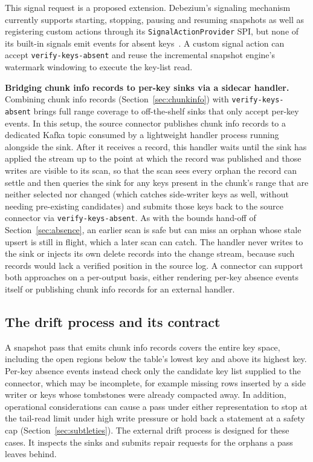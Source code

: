 \documentclass[sigconf,nonacm,10pt]{acmart}
\begin{document}
This signal request is a proposed extension. Debezium's signaling mechanism
currently supports starting, stopping, pausing and resuming snapshots as well
as registering custom actions through its \texttt{SignalActionProvider} SPI, but none of its built-in signals emit events for absent keys~\cite{debezium_signalling}. A
custom signal action can accept \texttt{verify-keys-absent} and reuse
the incremental snapshot engine's watermark windowing to execute the key-list
read.

\textbf{Bridging chunk info records to per-key sinks via a sidecar handler.} Combining
chunk info records (Section~\ref{sec:chunkinfo}) with
\texttt{verify-keys-absent} brings full range coverage
to off-the-shelf sinks that only accept per-key events. In this setup, the source connector publishes chunk info records to a dedicated Kafka topic consumed by
a lightweight handler process running alongside the sink. After it receives a record, this handler waits until the sink has applied the stream up to the point at
which the record was published and those writes are visible to its scan, so
that the scan sees every orphan the record can settle and then queries the sink for any keys present in the
chunk's range that are neither selected nor changed (which catches side-writer keys as well, without needing
pre-existing candidates) and submits those keys back to the source connector
via \texttt{verify-keys-absent}. As with the bounds hand-off of
Section~\ref{sec:absence}, an earlier scan is safe but can miss an orphan whose
stale upsert is still in flight, which a later scan can catch. The handler never writes to the
sink or injects its own delete records into the change stream, because
such records would lack a verified position in the source log. A connector can support both approaches on a
per-output basis, either rendering per-key absence events itself or publishing
chunk info records for an external handler.

\subsection{The drift process and its contract}\label{sec:drift}

A snapshot pass that emits chunk info records covers the entire key space,
including the open regions below the table's lowest key and above its highest
key. Per-key absence events instead check only the candidate key list supplied
to the connector, which may be incomplete, for example missing rows inserted by
a side writer or keys whose tombstones were already compacted away. In
addition, operational considerations can cause a pass under either
representation to stop at the tail-read limit under high write pressure or hold
back a statement at a safety cap (Section~\ref{sec:subtleties}). The external
drift process is designed for these cases. It inspects the sinks and submits
repair requests for the orphans a pass leaves behind.
\end{document}
